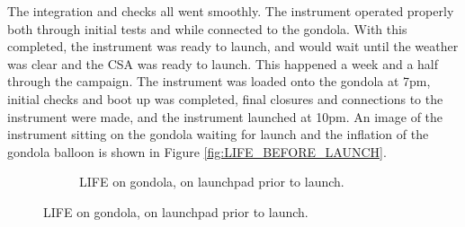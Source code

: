 The integration and checks all went smoothly. The instrument operated properly both through initial tests and while connected to the gondola. With this completed, the instrument was ready to launch, and would wait until the weather was clear and the CSA was ready to launch. This happened a week and a half through the campaign. The instrument was loaded onto the gondola at 7pm, initial checks and boot up was completed, final closures and connections to the instrument were made, and the instrument launched at 10pm. An image of the instrument sitting on the gondola waiting for launch and the inflation of the gondola balloon is shown in Figure \ref{fig:LIFE_BEFORE_LAUNCH}.

\begin{figure}
    \begin{subfigure}[h]{0.49\textwidth}
        \centering
        \caption{LIFE on gondola, on launchpad prior to launch.}

\end{subfigure}
\end{figure}
